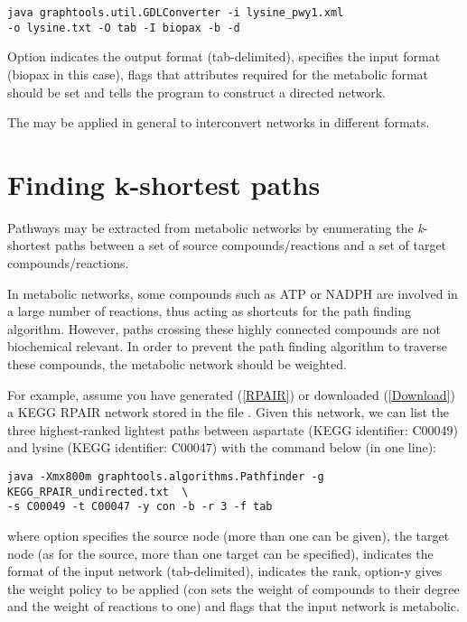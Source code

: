 \begin{lstlisting}
java graphtools.util.GDLConverter -i lysine_pwy1.xml 
-o lysine.txt -O tab -I biopax -b -d
\end{lstlisting}

Option  indicates the output format (tab-delimited), 
specifies the input format (biopax in this case),  flags that
attributes required for the metabolic format should be set and  tells
the program to construct a directed network.

The  may be applied in general to interconvert networks
in different formats.

\section{Finding k-shortest paths}

Pathways may be extracted from metabolic networks by enumerating the
\textit{k}-shortest paths between a set of source compounds/reactions and a
set of target compounds/reactions.

In metabolic networks, some compounds such as ATP or NADPH are involved in a
large number of reactions, thus acting as shortcuts for the path finding
algorithm. However, paths crossing these highly connected compounds are not
biochemical relevant. In order to prevent the path finding algorithm to traverse
these compounds, the metabolic network should be weighted.

For example, assume you have generated (\ref{RPAIR}) or downloaded
(\ref{Download}) a KEGG RPAIR network stored in the file 
. Given this network, we can list the 
three highest-ranked lightest paths between
aspartate (KEGG identifier: C00049) and lysine (KEGG identifier: C00047) with
the command below (in one line):

\begin{lstlisting}
java -Xmx800m graphtools.algorithms.Pathfinder -g KEGG_RPAIR_undirected.txt  \
-s C00049 -t C00047 -y con -b -r 3 -f tab
\end{lstlisting}

where option  specifies the source node (more than one can be given),
\option{-t} the target node (as for the source, more than one target can be
specified),\option{-f} indicates the format of the input network
(tab-delimited), \option{-r} indicates the rank, option{-y} gives the weight policy to be applied
(con sets the weight of compounds to their degree and the weight of reactions
to one) and \option{-b} flags that the input network is metabolic.

